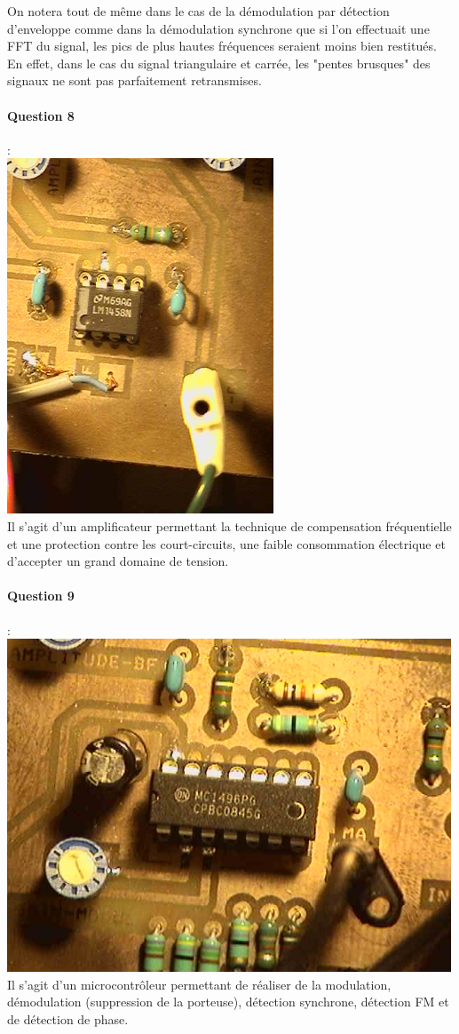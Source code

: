 \documentclass[french]{article}
\begin{document}
On notera tout de même dans le cas de la démodulation par détection d'enveloppe comme dans la démodulation synchrone que si l'on effectuait une FFT du signal, les pics de plus hautes fréquences seraient moins bien restitués. En effet, dans le cas du signal triangulaire et carrée, les "pentes brusques" des signaux ne sont pas parfaitement retransmises.
\paragraph{Question 8} : \\
\includegraphics[height=400px]{question8.jpg}\\
Il s'agit d'un amplificateur permettant la technique de compensation fréquentielle et une protection contre les court-circuits, une faible consommation électrique et d'accepter un grand domaine de tension. 
\paragraph{Question 9} : \\
\includegraphics[width=500px]{question9.jpg}\\
Il s'agit d'un microcontrôleur permettant de réaliser de la modulation, démodulation (suppression de la porteuse), détection synchrone, détection FM et de détection de phase. 
\end{document}
